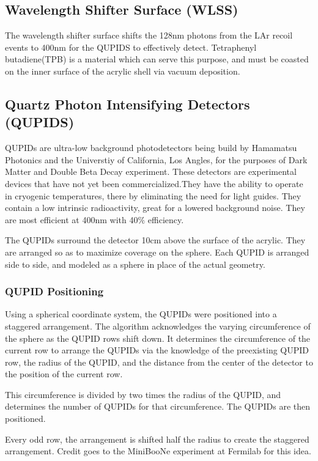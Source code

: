 \documentclass[11pt,a4paper,oneside]{report}
\begin{document}
\subsection{Wavelength Shifter Surface (WLSS)}
The wavelength shifter surface shifts the 128nm photons from the LAr recoil events to 400nm for the QUPIDS to effectively detect. Tetraphenyl butadiene(TPB) is a material which can serve this purpose, and must be coasted on the inner surface of the acrylic shell via vacuum deposition.

\subsection{Quartz Photon Intensifying Detectors (QUPIDS)}
QUPIDs are ultra-low background photodetectors being build by Hamamatsu Photonics and the Universtiy of California, Los Angles, for the purposes of Dark Matter and Double Beta Decay experiment\cite{20}. These detectors are experimental devices that have not yet been commercialized.They have the ability to operate in cryogenic temperatures, there by eliminating the need for light guides. They contain a low intrinsic radioactivity, great for a lowered background noise. They are most efficient  at 400nm\cite{19} with 40$\%$ efficiency. 

The QUPIDs surround the detector 10cm above the surface of the acrylic. They are arranged so as to maximize coverage on the sphere. Each QUPID is arranged side to side, and modeled as a sphere in place of the actual geometry. 

\subsubsection{QUPID Positioning}
Using a spherical coordinate system, the QUPIDs were positioned into a staggered arrangement. The algorithm acknowledges the varying circumference of the sphere as the QUPID rows shift down. It determines the circumference of the current row to arrange the QUPIDs via the knowledge of the preexisting QUPID row, the radius of the QUPID, and the distance from the center of the detector to the position of the current row. 

This circumference is divided by two times the radius of the QUPID, and determines the number of QUPIDs for that circumference. The QUPIDs are then positioned.

Every odd row, the arrangement is shifted half the radius to create the staggered arrangement. Credit goes to the MiniBooNe experiment at Fermilab for this idea. 
\end{document}
